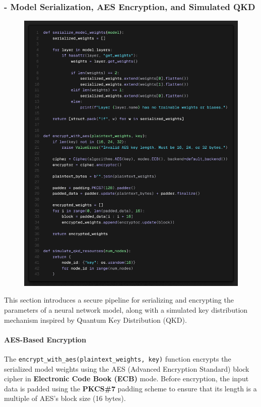 \documentclass[10pt]{article}
\begin{document}
\subsubsection*{- Model Serialization, AES Encryption, and Simulated QKD}
\begin{figure}[H]
	\centering
	\includegraphics[height = 0.52\textheight]{img/QFL_code/3.png}
\end{figure}
This section introduces a secure pipeline for serializing and encrypting the parameters of a neural network model, along with a simulated key distribution mechanism inspired by Quantum Key Distribution (QKD).
\paragraph{AES-Based Encryption}
The \texttt{encrypt\_with\_aes(plaintext\_weights, key)} function encrypts the serialized model weights using the AES (Advanced Encryption Standard) block cipher in \textbf{Electronic Code Book (ECB)} mode. Before encryption, the input data is padded using the \textbf{PKCS\#7} padding scheme to ensure that its length is a multiple of AES’s block size (16 bytes).
\end{document}
